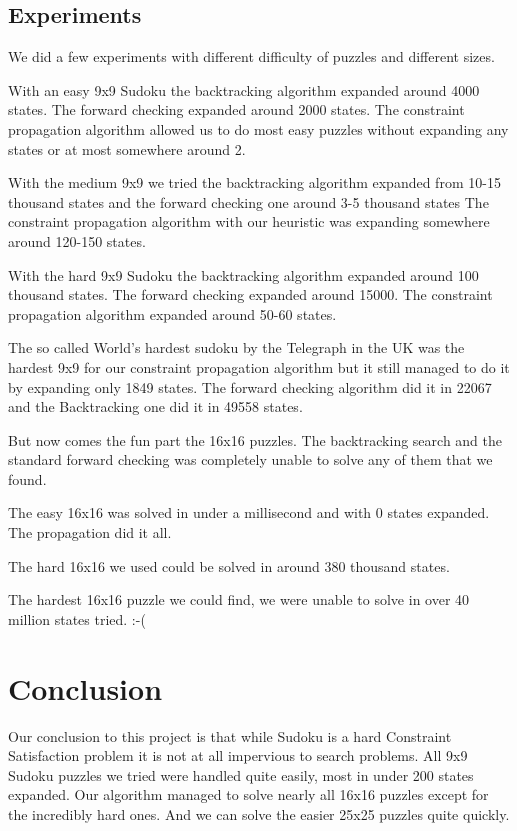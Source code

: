 \documentclass[12pt,a4paper]{article}
\begin{document}
\subsection*{Experiments}

We did a few experiments with different difficulty of puzzles and different sizes.

With an easy 9x9 Sudoku the backtracking algorithm expanded around 4000 states.
The forward checking expanded around 2000 states. The constraint propagation 
algorithm allowed us to do most easy puzzles without expanding any states or at most
somewhere around 2.

With the medium 9x9 we tried the backtracking algorithm expanded
from 10-15 thousand states and the forward checking one around 3-5 thousand states
The constraint propagation algorithm with our heuristic was expanding somewhere around 120-150 states.

With the hard 9x9 Sudoku the backtracking algorithm expanded around 100 thousand
states. The forward checking expanded around 15000. The constraint propagation
algorithm expanded around 50-60 states.

The so called World's hardest sudoku by the Telegraph in the UK was the hardest 9x9
for our constraint propagation algorithm but it still managed to do it by expanding
only 1849 states. The forward checking algorithm did it in 22067 and the Backtracking one
did it in 49558 states.

But now comes the fun part the 16x16 puzzles. The backtracking search and the 
standard forward checking was completely unable to solve any of them that we found.

The easy 16x16 was solved in under a millisecond and with 0 states expanded.
The propagation did it all.

The hard 16x16 we used could be solved in around 380 thousand states.

The hardest 16x16 puzzle we could find, we were unable to solve in over 40 million 
states tried. :-(

\pagebreak

\section*{Conclusion}

Our conclusion to this project is that while Sudoku is a hard Constraint
Satisfaction problem it is not at all impervious to search problems. All 9x9
Sudoku puzzles we tried were handled quite easily, most in under 200 states
expanded. Our algorithm managed to solve nearly all 16x16 puzzles except for
the incredibly hard ones. And we can solve the easier 25x25 puzzles quite
quickly.
\end{document}
